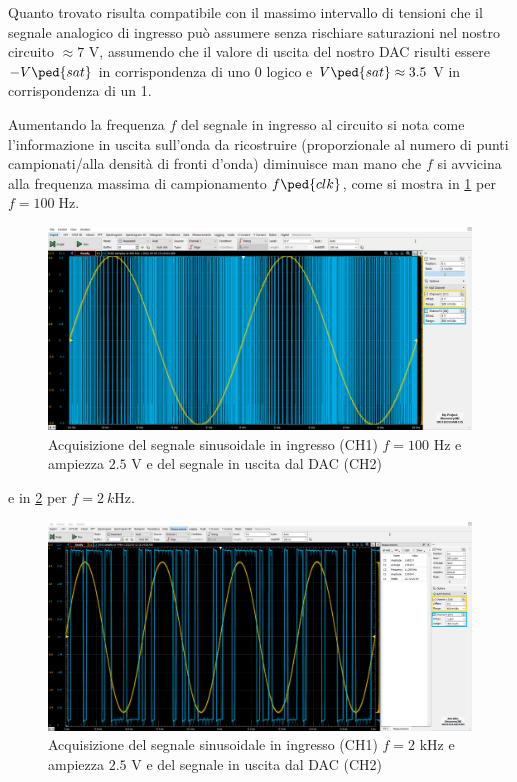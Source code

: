 \documentclass[10pt, a4paper, italian]{article}
\begin{document}
Quanto trovato risulta compatibile con il massimo intervallo di tensioni che
il segnale analogico di ingresso può assumere senza rischiare saturazioni nel
nostro circuito $\approx 7$ V, assumendo che il valore di uscita del nostro
DAC risulti essere $-V\ped{sat}$ in corrispondenza di uno 0 logico e
$V\ped{sat} \approx 3.5$ V in corrispondenza di un 1.

Aumentando la frequenza $f$ del segnale in ingresso al circuito si nota come
l'informazione in uscita sull'onda da ricostruire (proporzionale al numero di
punti campionati/alla densità di fronti d'onda) diminuisce man mano che $f$ si
avvicina alla frequenza massima di campionamento $f\ped{clk}$, come si mostra
in \cref{fig: sin100hz} per $f = 100 \; \si{\Hz}$.
\begin{figure}[htbp]
    \centering
	\includegraphics[width=\textwidth]{Conv.Sinusoide.100Hz.2}
    \caption{Acquisizione del segnale sinusoidale in ingresso (CH1)
    $f = 100$ Hz e ampiezza $2.5$ V e del segnale in uscita dal DAC (CH2)
    \label{fig: sin100hz}}
\end{figure}
e in \cref{fig: sin2khz} per $f = \SI{2}{k\Hz}$.
\begin{figure}[htbp]
    \centering
	\includegraphics[width=\textwidth]{sin2khz2.5v}
    \caption{Acquisizione del segnale sinusoidale in ingresso (CH1)
    $f = 2$ kHz e ampiezza $2.5$ V e del segnale in uscita dal DAC (CH2)
    \label{fig: sin2khz}}
\end{figure}
\end{document}
